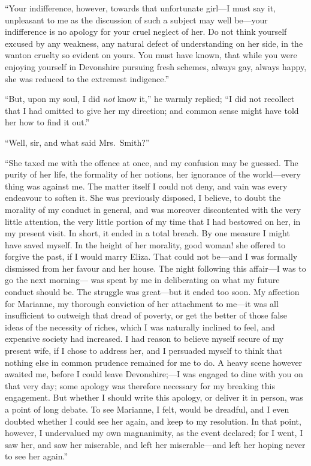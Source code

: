 \documentclass{article}
\begin{document}
``Your indifference, however, towards that unfortunate
girl---I must say it, unpleasant to me as the discussion
of such a subject may well be---your indifference is no
apology for your cruel neglect of her.  Do not think yourself
excused by any weakness, any natural defect of understanding
on her side, in the wanton cruelty so evident on yours.
You must have known, that while you were enjoying yourself
in Devonshire pursuing fresh schemes, always gay,
always happy, she was reduced to the extremest indigence.''

``But, upon my soul, I did \emph{not} know it,'' he warmly
replied; ``I did not recollect that I had omitted to give
her my direction; and common sense might have told her
how to find it out.''

``Well, sir, and what said Mrs.\ Smith?''

``She taxed me with the offence at once, and my confusion
may be guessed.  The purity of her life, the formality
of her notions, her ignorance of the world---every thing
was against me.  The matter itself I could not deny,
and vain was every endeavour to soften it.  She was
previously disposed, I believe, to doubt the morality of my
conduct in general, and was moreover discontented with
the very little attention, the very little portion of my
time that I had bestowed on her, in my present visit.
In short, it ended in a total breach.  By one measure I
might have saved myself.  In the height of her morality,
good woman! she offered to forgive the past, if I would
marry Eliza.  That could not be---and I was formally
dismissed from her favour and her house.  The night
following this affair---I was to go the next morning---%
was spent by me in deliberating on what my future conduct
should be.  The struggle was great---but it ended too soon.
My affection for Marianne, my thorough conviction of her
attachment to me---it was all insufficient to outweigh
that dread of poverty, or get the better of those false
ideas of the necessity of riches, which I was naturally
inclined to feel, and expensive society had increased.
I had reason to believe myself secure of my present wife,
if I chose to address her, and I persuaded myself to think
that nothing else in common prudence remained for me to do.
A heavy scene however awaited me, before I could leave
Devonshire;---I was engaged to dine with you on that very day;
some apology was therefore necessary for my breaking
this engagement.  But whether I should write this apology,
or deliver it in person, was a point of long debate.
To see Marianne, I felt, would be dreadful, and I even doubted
whether I could see her again, and keep to my resolution.
In that point, however, I undervalued my own magnanimity,
as the event declared; for I went, I saw her, and saw
her miserable, and left her miserable---and left her hoping
never to see her again.''
\end{document}
